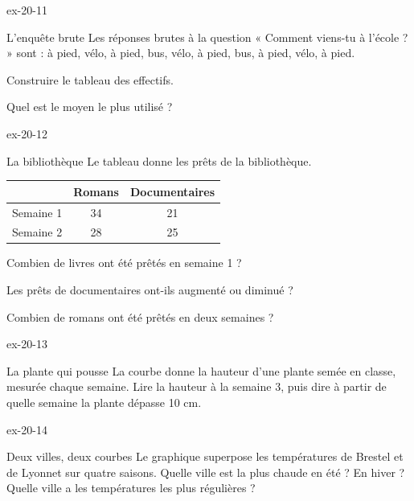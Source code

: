 \begin{blocLivre}{ex-20-11}\begin{exercice}[3]{L’enquête brute}
Les réponses brutes à la question « Comment viens-tu à l’école ? » sont : à pied, vélo, à pied, bus, vélo, à pied, bus, à pied, vélo, à pied.\begin{questions}
\item Construire le tableau des effectifs.
\item Quel est le moyen le plus utilisé ?
\end{questions}
\end{exercice}\end{blocLivre}
\begin{blocLivre}{ex-20-12}\begin{exercice}[3]{La bibliothèque}
Le tableau donne les prêts de la bibliothèque.\begin{center}\renewcommand{\arraystretch}{1.35}\begin{tabular}{c|cc}\toprule
 & Romans & Documentaires\\\midrule
Semaine 1 & 34 & 21\\
Semaine 2 & 28 & 25\\
\bottomrule\end{tabular}\end{center}\begin{questions}
\item Combien de livres ont été prêtés en semaine 1 ?
\item Les prêts de documentaires ont-ils augmenté ou diminué ?
\item Combien de romans ont été prêtés en deux semaines ?
\end{questions}
\end{exercice}\end{blocLivre}
\begin{blocLivre}{ex-20-13}\begin{exercice}[3]{La plante qui pousse}
La courbe donne la hauteur d’une plante semée en classe, mesurée chaque semaine. Lire la hauteur à la semaine 3, puis dire à partir de quelle semaine la plante dépasse 10 cm.
\label{fig-ex-20-13}
\end{exercice}\end{blocLivre}
\begin{blocLivre}{ex-20-14}\begin{exercice}[3]{Deux villes, deux courbes}
Le graphique superpose les températures de Brestel et de Lyonnet sur quatre saisons. Quelle ville est la plus chaude en été ? En hiver ? Quelle ville a les températures les plus régulières ?
\label{fig-ex-20-14}
\end{exercice}\end{blocLivre}
